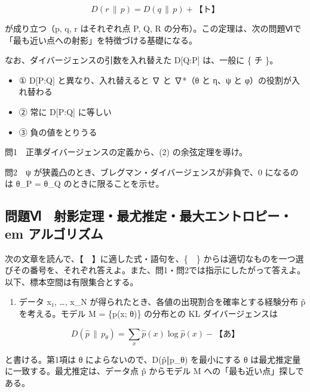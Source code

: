 \documentclass[
  10pt,
  a4paper,
]{article}
\providecommand{\tightlist}{%
  \setlength{\itemsep}{0pt}\setlength{\parskip}{0pt}}
\begin{document}
\[D(r \,\|\, p) = D(q \,\|\, p) + \text{【ト】}\]

が成り立つ（p, q, r はそれぞれ点 P, Q, R
の分布）。この定理は、次の問題Ⅵで「最も近い点への射影」を特徴づける基礎になる。

なお、ダイバージェンスの引数を入れ替えた D{[}Q:P{]} は、一般に \{ チ
\}。

\begin{itemize}
\tightlist
\item
  ① D{[}P:Q{]} と異なり、入れ替えると ∇ と ∇*（θ と η、ψ と
  φ）の役割が入れ替わる
\item
  ② 常に D{[}P:Q{]} に等しい
\item
  ③ 負の値をとりうる
\end{itemize}

問1　正準ダイバージェンスの定義から、(2) の余弦定理を導け。

問2　ψ が狭義凸のとき、ブレグマン・ダイバージェンスが非負で、0
になるのは θ\_P = θ\_Q のときに限ることを示せ。

\hypertarget{ux554fux984cux2175-ux5c04ux5f71ux5b9aux7406ux6700ux5c24ux63a8ux5b9aux6700ux5927ux30a8ux30f3ux30c8ux30edux30d4ux30fcem-ux30a2ux30ebux30b4ux30eaux30baux30e0}{%
\subsection{問題Ⅵ　射影定理・最尤推定・最大エントロピー・em
アルゴリズム}\label{ux554fux984cux2175-ux5c04ux5f71ux5b9aux7406ux6700ux5c24ux63a8ux5b9aux6700ux5927ux30a8ux30f3ux30c8ux30edux30d4ux30fcem-ux30a2ux30ebux30b4ux30eaux30baux30e0}}

次の文章を読んで、【　】に適した式・語句を、\{　\}
からは適切なものを一つ選びその番号を、それぞれ答えよ。また、問1・問2では指示にしたがって答えよ。以下、標本空間は有限集合とする。

\begin{enumerate}
\def\labelenumi{(\arabic{enumi})}
\tightlist
\item
  データ x{\fallbackfont ₁}, \ldots, x\_N
  が得られたとき、各値の出現割合を確率とする経験分布 {\fallbackfont p̂}
  を考える。モデル M = \{p(x; θ)\} の分布との KL ダイバージェンスは
\end{enumerate}

\[D(\hat p \,\|\, p_\theta) = \sum_x \hat p(x) \log \hat p(x) - \text{【あ】}\]

と書ける。第1項は θ によらないので、D({\fallbackfont p̂}‖p\_θ)
を最小にする θ は最尤推定量に一致する。最尤推定は、データ点
{\fallbackfont p̂} からモデル M への「最も近い点」探しである。
\end{document}
